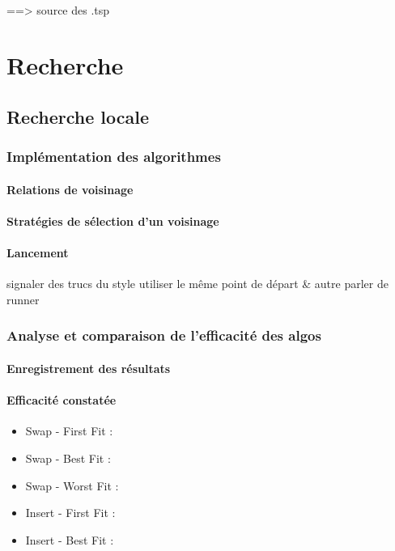 \documentclass[a4paper,10pt]{report}
\begin{document}
\paragraph{} %
==> source des .tsp

\part{Recherche}
\chapter{Recherche locale}
\section{Implémentation des algorithmes}
\subsection{Relations de voisinage}

\subsection{Stratégies de sélection d'un voisinage}

\subsection{Lancement}
signaler des trucs du style utiliser le même point de départ \& autre
parler de runner

\section{Analyse et comparaison de l'efficacité des algos}
\subsection{Enregistrement des résultats}

\subsection{Efficacité constatée}
\begin{itemize}
 \item Swap - First Fit : 
 \item Swap - Best Fit : 
 \item Swap - Worst Fit : 
 \item Insert - First Fit :
 \item Insert - Best Fit :
\end{itemize}
\end{document}
